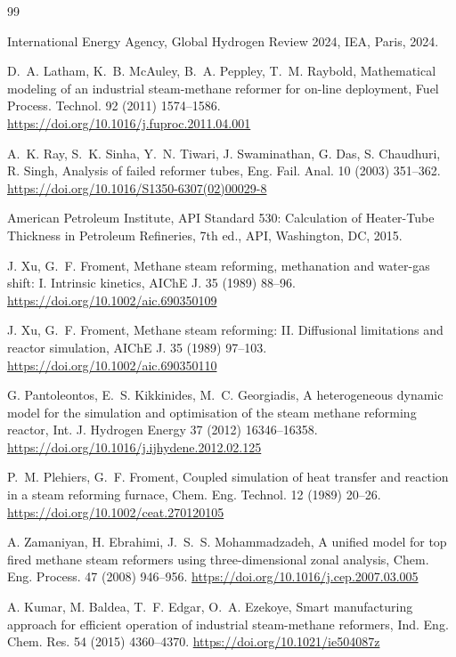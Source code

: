 \documentclass[final,3p,times]{elsarticle}
\begin{document}
\begin{thebibliography}{99}
\setlength{\itemsep}{0pt}

 International Energy Agency, Global Hydrogen Review 2024, IEA, Paris, 2024.

 D.~A. Latham, K.~B. McAuley, B.~A. Peppley, T.~M. Raybold, Mathematical modeling of an industrial steam-methane reformer for on-line deployment, Fuel Process. Technol. 92 (2011) 1574--1586. \url{https://doi.org/10.1016/j.fuproc.2011.04.001}

 A.~K. Ray, S.~K. Sinha, Y.~N. Tiwari, J. Swaminathan, G. Das, S. Chaudhuri, R. Singh, Analysis of failed reformer tubes, Eng. Fail. Anal. 10 (2003) 351--362. \url{https://doi.org/10.1016/S1350-6307(02)00029-8}

 American Petroleum Institute, API Standard 530: Calculation of Heater-Tube Thickness in Petroleum Refineries, 7th ed., API, Washington, DC, 2015.

 J. Xu, G.~F. Froment, Methane steam reforming, methanation and water-gas shift: I. Intrinsic kinetics, AIChE J. 35 (1989) 88--96. \url{https://doi.org/10.1002/aic.690350109}

 J. Xu, G.~F. Froment, Methane steam reforming: II. Diffusional limitations and reactor simulation, AIChE J. 35 (1989) 97--103. \url{https://doi.org/10.1002/aic.690350110}

 G. Pantoleontos, E.~S. Kikkinides, M.~C. Georgiadis, A heterogeneous dynamic model for the simulation and optimisation of the steam methane reforming reactor, Int. J. Hydrogen Energy 37 (2012) 16346--16358. \url{https://doi.org/10.1016/j.ijhydene.2012.02.125}

 P.~M. Plehiers, G.~F. Froment, Coupled simulation of heat transfer and reaction in a steam reforming furnace, Chem. Eng. Technol. 12 (1989) 20--26. \url{https://doi.org/10.1002/ceat.270120105}

 A. Zamaniyan, H. Ebrahimi, J.~S.~S. Mohammadzadeh, A unified model for top fired methane steam reformers using three-dimensional zonal analysis, Chem. Eng. Process. 47 (2008) 946--956. \url{https://doi.org/10.1016/j.cep.2007.03.005}

 A. Kumar, M. Baldea, T.~F. Edgar, O.~A. Ezekoye, Smart manufacturing approach for efficient operation of industrial steam-methane reformers, Ind. Eng. Chem. Res. 54 (2015) 4360--4370. \url{https://doi.org/10.1021/ie504087z}


\end{thebibliography}
\end{document}
